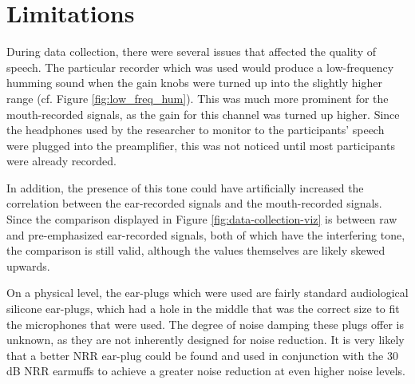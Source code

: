 
\section{Limitations}
\label{chap2:limitations}

During data collection, there were several issues that affected the quality of speech.  
The particular recorder which was used would produce a low-frequency humming sound when the gain knobs were turned up into the slightly higher range (cf. Figure \ref{fig:low_freq_hum}).  This was much more prominent for the mouth-recorded signals, as the gain for this channel was turned up higher.  Since the headphones used by the researcher to monitor to the participants' speech were plugged into the preamplifier, this was not noticed until most participants were already recorded.

In addition, the presence of this tone could have artificially increased the correlation between the ear-recorded signals and the mouth-recorded signals.  Since the comparison displayed in Figure \ref{fig:data-collection-viz} is between raw and pre-emphasized ear-recorded signals, both of which have the interfering tone, the comparison is still valid, although the values themselves are likely skewed upwards.

On a physical level, the ear-plugs which were used are fairly standard audiological silicone ear-plugs, which had a hole in the middle that was the correct size to fit the microphones that were used.  The degree of noise damping these plugs offer is unknown, as they are not inherently designed for noise reduction.  It is very likely that a better NRR ear-plug could be found and used in conjunction with the 30 dB NRR earmuffs to achieve a greater noise reduction at even higher noise levels.

